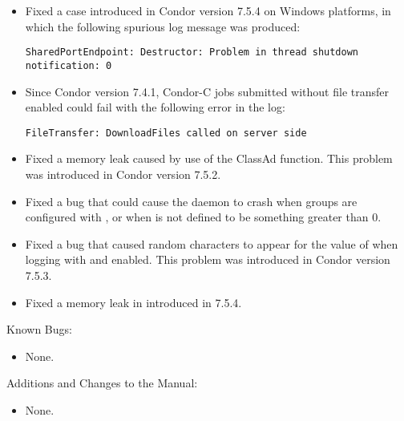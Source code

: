 \begin{itemize}
\item Fixed a case introduced in Condor version 7.5.4 on Windows platforms,
in which the following spurious log message was produced:
\begin{verbatim}
SharedPortEndpoint: Destructor: Problem in thread shutdown notification: 0
\end{verbatim}

\item Since Condor version 7.4.1,
Condor-C jobs submitted without file transfer enabled could
fail with the following error in the  log:
\begin{verbatim}
FileTransfer: DownloadFiles called on server side
\end{verbatim}

\item Fixed a memory leak caused by use of the ClassAd 
  function.  This problem was introduced in Condor version 7.5.2.

\item Fixed a bug that could cause the  daemon to
  crash when groups are configured with
  , or when
   is not defined to be something
  greater than 0.

\item Fixed a bug that caused random characters to appear for the
  value of  when logging with 
  and  enabled.
  This problem was introduced in Condor version 7.5.3.

\item Fixed a memory leak in  introduced in 7.5.4.

\end{itemize}

\noindent Known Bugs:

\begin{itemize}

\item None.

\end{itemize}

\noindent Additions and Changes to the Manual:

\begin{itemize}

\item None.

\end{itemize}



